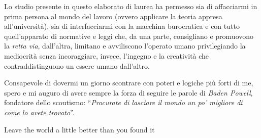 \thispagestyle{empty}
\mbox{}

\newpage
\thispagestyle{empty}
\vspace*{5cm}
\begin{changemargin}{0.5cm}{0.5cm}
	\noindent
	Lo studio presente in questo elaborato di laurea ha permesso sia di affacciarmi in prima persona al mondo del lavoro (ovvero applicare la teoria appresa all'università), sia di interfacciarmi con la macchina burocratica e con tutto quell'apparato di normative e leggi che, da una parte, consigliano e promuovono la \emph{retta via}, dall'altra, limitano e avviliscono l'operato umano privilegiando la mediocrità senza incoraggiare, invece, l'ingegno e la creatività che contraddistinguono un essere umano dall'altro.
	
	\vspace{1em}\noindent
	Consapevole di dovermi un giorno scontrare con poteri e logiche più forti di me, spero e mi
	auguro di avere sempre la forza di seguire le parole di \emph{Baden Powell}, fondatore dello scoutismo: ``\emph{Procurate di lasciare il mondo un po' migliore di come lo avete trovato}''.
	\vspace{1em}
\end{changemargin}

\newpage
\thispagestyle{empty}
\vspace*{8cm}
\centering\large Leave the world a little better than you found it\\